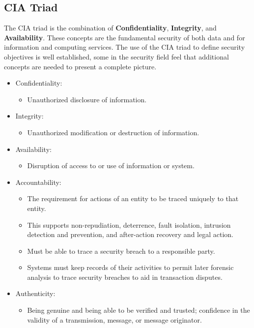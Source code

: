 \documentclass[a4paper]{article}
\theoremstyle{definition}
\theoremstyle{remark}
\begin{document}
	\subsection{CIA Triad}
	The CIA triad is the combination of \textbf{Confidentiality}, \textbf{Integrity}, and \textbf{Availability}.
	These concepts are the fundamental security of both data and for information and computing services.
	The use of the CIA triad to define security objectives is well established, some in the security
	field feel that additional concepts are needed to present a complete picture.
	\begin{itemize}
		\item Confidentiality:
			\begin{itemize}
				\item Unauthorized disclosure of information.
			\end{itemize}
		\item Integrity:
			\begin{itemize}
				\item Unauthorized modification or destruction of information.
			\end{itemize}
		\item Availability:
			\begin{itemize}
				\item Disruption of access to or use of information or system.
			\end{itemize}
		\item Accountability:
			\begin{itemize}
				\item The requirement for actions of an entity to be traced uniquely to
					that entity.
				\item This supports non-repudiation, deterrence, fault isolation, intrusion
					detection and prevention, and after-action recovery and legal action.
				\item Must be able to trace a security breach to a responsible party.
				\item Systems must keep records of their activities to permit later forensic
					analysis to trace security breaches to aid in transaction disputes.
			\end{itemize}
		\item Authenticity:
			\begin{itemize}
				\item Being genuine and being able to be verified and trusted; confidence
					in the validity of a transmission, message, or message originator.
			\end{itemize}
	\end{itemize}
	
\end{document}
